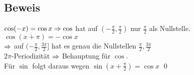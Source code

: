 \subsection*{Beweis}
$\cos(-x)=\cos x \Rightarrow \cos$ hat auf $(-\frac{\pi}{2}, \frac{\pi}{2})$ nur $\frac{\pi}{2}$ als Nullstelle. $\cos(x+\pi) = -\cos x$\\
$\Rightarrow$ auf $(-\frac{\pi}{2}, \frac{3 \pi}{2}]$ hat es genau die Nullstellen $\frac{\pi}{2}, \frac{3 \pi}{2}$\\
$2 \pi$-Periodizität $\Rightarrow$ Behauptung für $\cos$.\\
Für $\sin$ folgt daraus wegen $\sin(x+\frac{\pi}{2}) = \cos x$ \qed